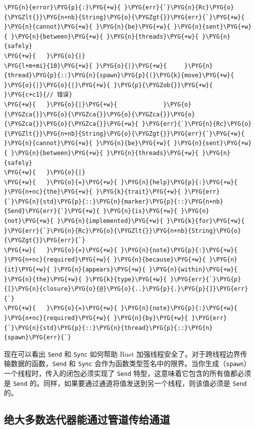 \begin{Verbatim}[commandchars=\\\{\},breaklines=true,breakanywhere=true,fontsize=\codefont,xleftmargin=17bp]
\PYG{n}{error}\PYG{p}{:}\PYG{+w}{ }\PYG{err}{`}\PYG{n}{Rc}\PYG{o}{\PYGZlt{}}\PYG{n+nb}{String}\PYG{o}{\PYGZgt{}}\PYG{err}{`}\PYG{+w}{ }\PYG{n}{cannot}\PYG{+w}{ }\PYG{n}{be}\PYG{+w}{ }\PYG{n}{sent}\PYG{+w}{ }\PYG{n}{between}\PYG{+w}{ }\PYG{n}{threads}\PYG{+w}{ }\PYG{n}{safely}
\PYG{+w}{   }\PYG{o}{|}
\PYG{l+m+mi}{10}\PYG{+w}{ }\PYG{o}{|}\PYG{+w}{     }\PYG{n}{thread}\PYG{p}{::}\PYG{n}{spawn}\PYG{p}{(}\PYG{k}{move}\PYG{+w}{ }\PYG{o}{|}\PYG{o}{|}\PYG{+w}{ }\PYG{p}{\PYGZob{}}\PYG{+w}{  }\PYG{c+c1}{// 错误}
\PYG{+w}{   }\PYG{o}{|}\PYG{+w}{             }\PYG{o}{\PYGZca{}}\PYG{o}{\PYGZca{}}\PYG{o}{\PYGZca{}}\PYG{o}{\PYGZca{}}\PYG{o}{\PYGZca{}}\PYG{+w}{ }\PYG{err}{`}\PYG{n}{Rc}\PYG{o}{\PYGZlt{}}\PYG{n+nb}{String}\PYG{o}{\PYGZgt{}}\PYG{err}{`}\PYG{+w}{ }\PYG{n}{cannot}\PYG{+w}{ }\PYG{n}{be}\PYG{+w}{ }\PYG{n}{sent}\PYG{+w}{ }\PYG{n}{between}\PYG{+w}{ }\PYG{n}{threads}\PYG{+w}{ }\PYG{n}{safely}
\PYG{+w}{   }\PYG{o}{|}
\PYG{+w}{   }\PYG{o}{=}\PYG{+w}{ }\PYG{n}{help}\PYG{p}{:}\PYG{+w}{ }\PYG{n+nc}{the}\PYG{+w}{ }\PYG{k}{trait}\PYG{+w}{ }\PYG{err}{`}\PYG{n}{std}\PYG{p}{::}\PYG{n}{marker}\PYG{p}{::}\PYG{n+nb}{Send}\PYG{err}{`}\PYG{+w}{ }\PYG{n}{is}\PYG{+w}{ }\PYG{n}{not}\PYG{+w}{ }\PYG{n}{implemented}\PYG{+w}{ }\PYG{k}{for}\PYG{+w}{ }\PYG{err}{`}\PYG{n}{Rc}\PYG{o}{\PYGZlt{}}\PYG{n+nb}{String}\PYG{o}{\PYGZgt{}}\PYG{err}{`}
\PYG{+w}{   }\PYG{o}{=}\PYG{+w}{ }\PYG{n}{note}\PYG{p}{:}\PYG{+w}{ }\PYG{n+nc}{required}\PYG{+w}{ }\PYG{n}{because}\PYG{+w}{ }\PYG{n}{it}\PYG{+w}{ }\PYG{n}{appears}\PYG{+w}{ }\PYG{n}{within}\PYG{+w}{ }\PYG{n}{the}\PYG{+w}{ }\PYG{k}{type}\PYG{+w}{ }\PYG{err}{`}\PYG{p}{[}\PYG{n}{closure}\PYG{o}{@}\PYG{o}{..}\PYG{p}{.}\PYG{p}{]}\PYG{err}{`}
\PYG{+w}{   }\PYG{o}{=}\PYG{+w}{ }\PYG{n}{note}\PYG{p}{:}\PYG{+w}{ }\PYG{n+nc}{required}\PYG{+w}{ }\PYG{n}{by}\PYG{+w}{ }\PYG{err}{`}\PYG{n}{std}\PYG{p}{::}\PYG{n}{thread}\PYG{p}{::}\PYG{n}{spawn}\PYG{err}{`}
\end{Verbatim}

现在可以看出 \texttt{Send} 和 \texttt{Sync} 如何帮助 Rust 加强线程安全了。对于跨线程边界传输数据的函数，\texttt{Send} 和 \texttt{Sync} 会作为函数类型签名中的限界。当你生成（\texttt{spawn}）一个线程时，传入的闭包必须实现了 \texttt{Send} 特型，这意味着它包含的所有值都必须是 \texttt{Send} 的。同样，如果要通过通道将值发送到另一个线程，则该值必须是 \texttt{Send} 的。

\subsection{绝大多数迭代器能通过管道传给通道}

